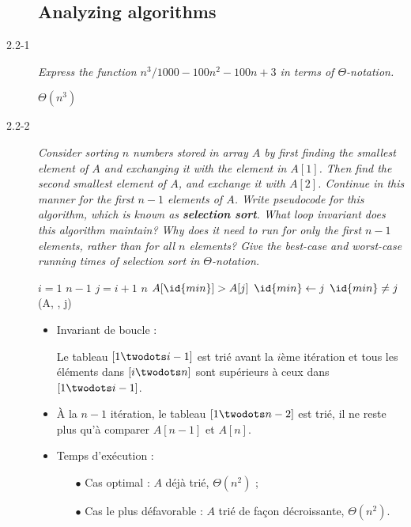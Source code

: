 \begin{description}
\begin{ex}
  \end{ex}

  \subsection{Analyzing algorithms}

\item[2.2-1] {\itshape Express the function $n^3/1000-100n^2-100n+3$ in terms of $\Theta$-notation.}
  \begin{ex}
    $\Theta(n^3)$
  \end{ex}

\item[2.2-2] {\itshape
  Consider sorting $n$ numbers stored in array $A$ by first finding the smallest element of $A$ and exchanging it with the element in $A[1]$. Then find the second smallest element of $A$, and exchange it with $A[2]$. Continue in this manner for the first $n-1$ elements of $A$. Write pseudocode for this algorithm, which is known as {\bfseries selection sort}. What loop invariant does this algorithm maintain? Why does it need to run for only the first $n-1$ elements, rather than for all $n$ elements? Give the best-case and worst-case running times of selection sort in $\Theta$-notation.}

  \begin{ex}
    \begin{codebox}
       \li \For $i = 1$ \To $n-1$ \Do
       \li {}
       \li \For $j = i+1$ \To $n$ \Do
       \li \If $A[\id{min}] > A[j]$ \Then
       \li $\id{min} \gets j$ \End \End
       \li \If $\id{min} \ne j$ \Then
       \li {}(A, , j) %
    \end{codebox}

    \begin{itemize}
      \item Invariant de boucle : 

        Le tableau $[1 \twodots i-1]$ est tri\'e avant la $i$\`eme it\'eration et tous les \'el\'ements dans $[i \twodots n]$ sont sup\'erieurs \`a ceux dans $[1\twodots i-1]$.

      \item \`A la $n-1$ it\'eration, le tableau $[1\twodots n-2]$ est tri\'e, il ne reste plus qu'\`a comparer $A[n-1]$ et $A[n]$.

     \item Temps d'ex\'ecution :
        \begin{itemize}
          \item[$\bullet$] Cas optimal : $A$ d\'ej\`a tri\'e, $\Theta(n^2)$ ;
          \item[$\bullet$] Cas le plus d\'efavorable : $A$ tri\'e de fa\c{c}on d\'ecroissante, $\Theta(n^2)$.
        \end{itemize}


\end{itemize}
\end{ex}
\end{description}
